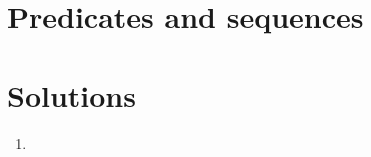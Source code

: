 \section{Predicates and sequences}

\section*{Solutions}

\begin{enumerate}
  \item
\end{enumerate}
